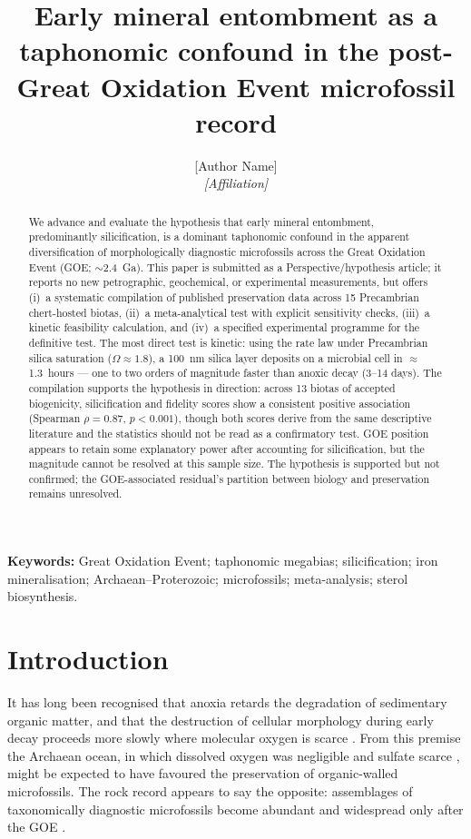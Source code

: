 \documentclass[11pt]{article}
\title{\vspace{-1.0cm}\textbf{Early mineral entombment as a taphonomic confound in the
post-Great Oxidation Event microfossil record}}
\author{[Author Name]\\
\small\textit{[Affiliation]}}
\date{}
\begin{document}
\maketitle

\begin{abstract}
\noindent We advance and evaluate the hypothesis that early mineral entombment, predominantly
silicification, is a dominant taphonomic confound in the apparent diversification of morphologically
diagnostic microfossils across the Great Oxidation Event (GOE; $\sim$2.4~Ga). This paper is submitted
as a Perspective/hypothesis article; it reports no new petrographic, geochemical, or experimental
measurements, but offers (i)~a systematic compilation of published preservation data across 15
Precambrian chert-hosted biotas, (ii)~a meta-analytical test with explicit sensitivity checks,
(iii)~a kinetic feasibility calculation, and (iv)~a specified experimental programme for the
definitive test. The most direct test is kinetic: using the \citet{Rimstidt1980} rate law under
Precambrian silica saturation ($\Omega \approx 1.8$), a 100~nm silica layer deposits on a microbial
cell in $\approx$1.3~hours --- one to two orders of magnitude faster than anoxic decay (3--14 days).
The compilation supports the hypothesis in direction: across 13 biotas of accepted biogenicity,
silicification and fidelity scores show a consistent positive association (Spearman $\rho = 0.87$,
$p < 0.001$), though both scores derive from the same descriptive literature and the statistics
should not be read as a confirmatory test. GOE position appears to retain some explanatory power
after accounting for silicification, but the magnitude cannot be resolved at this sample size. The
hypothesis is supported but not confirmed; the GOE-associated residual's partition between biology
and preservation remains unresolved.
\end{abstract}

\noindent\textbf{Keywords:} Great Oxidation Event; taphonomic megabias; silicification; iron
mineralisation; Archaean--Proterozoic; microfossils; meta-analysis; sterol biosynthesis.

\section{Introduction}

It has long been recognised that anoxia retards the degradation of sedimentary organic matter, and
that the destruction of cellular morphology during early decay proceeds more slowly where molecular
oxygen is scarce \citep{Canfield1994,Hedges1995}. From this premise the Archaean ocean, in which
dissolved oxygen was negligible \citep{Pavlov2002} and sulfate scarce \citep{Habicht2002,Crowe2014},
might be expected to have favoured the preservation of organic-walled microfossils. The rock record
appears to say the opposite: assemblages of taxonomically diagnostic microfossils become abundant
and widespread only after the GOE \citep{Javaux2018,Wacey2014}.
\end{document}
